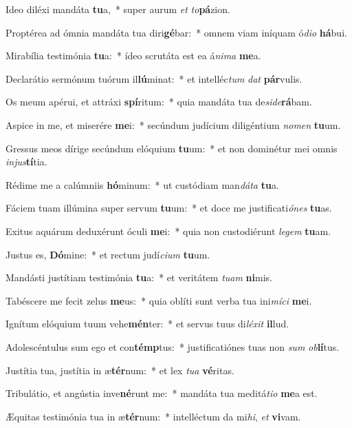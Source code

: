 \item Ideo diléxi mandáta \textbf{tu}a,~* super aurum \textit{et} \textit{to}\textbf{pá}zion.
\item Proptérea ad ómnia mandáta tua diri\textbf{gé}bar:~* omnem viam iníquam ó\textit{di}\textit{o} \textbf{há}bui.
\item Mirabília testimónia \textbf{tu}a:~* ídeo scrutáta est ea á\textit{ni}\textit{ma} \textbf{me}a.
\item Declarátio sermónum tuórum il\textbf{lú}minat:~* et intelléc\textit{tum} \textit{dat} \textbf{pár}vulis.
\item Os meum apérui, et attráxi \textbf{spí}ritum:~* quia mandáta tua de\textit{si}\textit{de}\textbf{rá}bam.
\item Aspice in me, et miserére \textbf{me}i:~* secúndum judícium diligéntium \textit{no}\textit{men} \textbf{tu}um.
\item Gressus meos dírige secúndum elóquium \textbf{tu}um:~* et non dominétur mei omnis \textit{in}\textit{jus}\textbf{tí}tia.
\item Rédime me a calúmniis \textbf{hó}minum:~* ut custódiam man\textit{dá}\textit{ta} \textbf{tu}a.
\item Fáciem tuam illúmina super servum \textbf{tu}um:~* et doce me justificati\textit{ó}\textit{nes} \textbf{tu}as.
\item Exitus aquárum deduxérunt óculi \textbf{me}i:~* quia non custodiérunt \textit{le}\textit{gem} \textbf{tu}am.
\item Justus es, \textbf{Dó}mine:~* et rectum judí\textit{ci}\textit{um} \textbf{tu}um.
\item Mandásti justítiam testimónia \textbf{tu}a:~* et veritátem \textit{tu}\textit{am} \textbf{ni}mis.
\item Tabéscere me fecit zelus \textbf{me}us:~* quia oblíti sunt verba tua ini\textit{mí}\textit{ci} \textbf{me}i.
\item Ignítum elóquium tuum vehe\textbf{mén}ter:~* et servus tuus di\textit{lé}\textit{xit} \textbf{il}lud.
\item Adolescéntulus sum ego et con\textbf{témp}tus:~* justificatiónes tuas non \textit{sum} \textit{ob}\textbf{lí}tus.
\item Justítia tua, justítia in æ\textbf{tér}num:~* et lex \textit{tu}\textit{a} \textbf{vé}ritas.
\item Tribulátio, et angústia inve\textbf{né}runt me:~* mandáta tua meditá\textit{ti}\textit{o} \textbf{me}a est.
\item Æquitas testimónia tua in æ\textbf{tér}num:~* intelléctum da mi\textit{hi}, \textit{et} \textbf{vi}vam.
